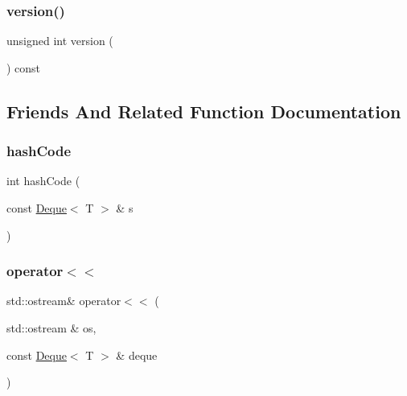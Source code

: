 \mbox{\label{classDeque_a0aa696ccb72cbf928535d6b646bac1aa}} 
\subsubsection{\texorpdfstring{version()}{version()}}
{\footnotesize\ttfamily unsigned int version (\begin{DoxyParamCaption}{ }\end{DoxyParamCaption}) const}



\subsection{Friends And Related Function Documentation}
\mbox{\label{classDeque_aa9e4a693df95cedc23d501cce865d9af}} 
\subsubsection{\texorpdfstring{hash\+Code}{hashCode}}
{\footnotesize\ttfamily int hash\+Code (\begin{DoxyParamCaption}\item[{const \mbox{\hyperlink{classDeque}{Deque}}$<$ T $>$ \&}]{s }\end{DoxyParamCaption})\hspace{0.3cm}{\ttfamily [friend]}}

\mbox{\label{classDeque_a369ddf8d137598b1bf09d82fbcae587c}} 
\subsubsection{\texorpdfstring{operator$<$$<$}{operator<<}}
{\footnotesize\ttfamily std\+::ostream\& operator$<$$<$ (\begin{DoxyParamCaption}\item[{std\+::ostream \&}]{os,  }\item[{const \mbox{\hyperlink{classDeque}{Deque}}$<$ T $>$ \&}]{deque }\end{DoxyParamCaption})\hspace{0.3cm}{\ttfamily [friend]}}

